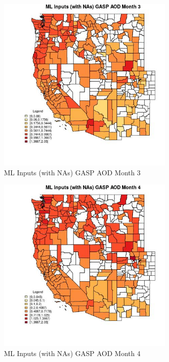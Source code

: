 \begin{figure} 
\centering  
\includegraphics[width=0.77\textwidth]{Code_Outputs/Report_ML_input_PM25_Step4_part_e_de_duplicated_aves_compiled_2019-05-21wNAs_CountyGASP_AODmedianMonth3.jpg} 
\caption{\label{fig:Report_ML_input_PM25_Step4_part_e_de_duplicated_aves_compiled_2019-05-21wNAsCountyGASP_AODmedianMonth3}ML Inputs (with NAs) GASP AOD Month 3} 
\end{figure} 
 

\begin{figure} 
\centering  
\includegraphics[width=0.77\textwidth]{Code_Outputs/Report_ML_input_PM25_Step4_part_e_de_duplicated_aves_compiled_2019-05-21wNAs_CountyGASP_AODmedianMonth4.jpg} 
\caption{\label{fig:Report_ML_input_PM25_Step4_part_e_de_duplicated_aves_compiled_2019-05-21wNAsCountyGASP_AODmedianMonth4}ML Inputs (with NAs) GASP AOD Month 4} 
\end{figure} 
 


